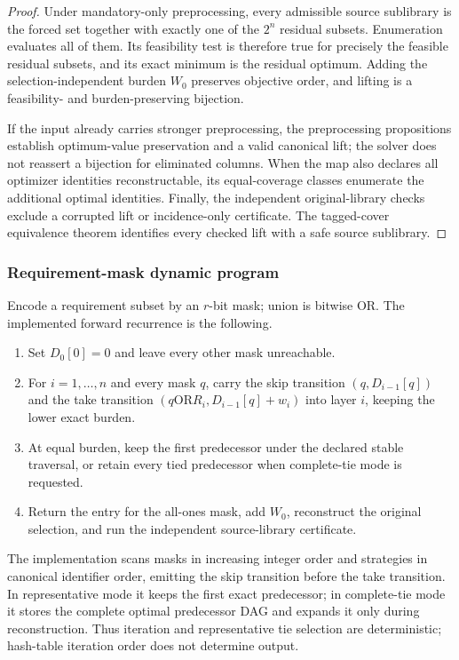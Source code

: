 \begin{proof}
Under mandatory-only preprocessing, every admissible source sublibrary is the
forced set together with exactly one of the $2^n$ residual subsets.
Enumeration evaluates all of them.  Its feasibility test is therefore true
for precisely the feasible residual subsets, and its exact minimum is the
residual optimum.  Adding the selection-independent burden $W_0$ preserves
objective order, and lifting is a feasibility- and burden-preserving
bijection.

If the input already carries stronger preprocessing, the preprocessing
propositions establish optimum-value preservation and a valid canonical lift;
the solver does not reassert a bijection for eliminated columns.  When the map
also declares all optimizer identities reconstructable, its equal-coverage
classes enumerate the additional optimal identities.  Finally, the
independent original-library checks exclude a corrupted lift or incidence-only
certificate.  The tagged-cover equivalence theorem identifies every checked
lift with a safe source sublibrary.
\end{proof}

\subsubsection{Requirement-mask dynamic program}
Encode a requirement subset by an $r$-bit mask; union is bitwise OR.  The
implemented forward recurrence is the following.

\begin{enumerate}
\item Set $D_0[0]=0$ and leave every other mask unreachable.
\item For $i=1,\ldots,n$ and every mask $q$, carry the skip transition
      $(q,D_{i-1}[q])$ and the take transition
      $(q\mathbin{\mathrm{OR}}R_i,D_{i-1}[q]+w_i)$ into layer $i$, keeping
      the lower exact burden.
\item At equal burden, keep the first predecessor under the declared stable
      traversal, or retain every tied predecessor when complete-tie mode is
      requested.
\item Return the entry for the all-ones mask, add $W_0$, reconstruct the
      original selection, and run the independent source-library certificate.
\end{enumerate}

The implementation scans masks in increasing integer order and strategies in
canonical identifier order, emitting the skip transition before the take
transition.  In representative mode it keeps the first exact predecessor; in
complete-tie mode it stores the complete optimal predecessor DAG and expands
it only during reconstruction.  Thus iteration and representative tie
selection are deterministic; hash-table iteration order does not determine
output.

